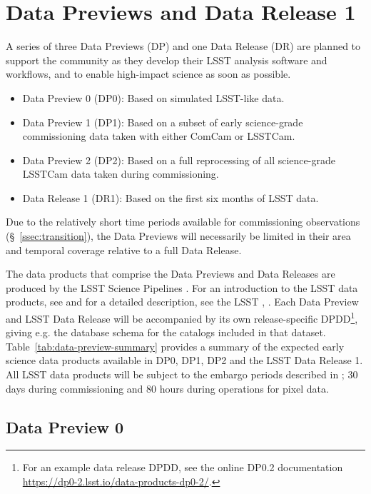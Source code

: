 \section{Data Previews and Data Release 1} 
\label{sec:datapreview}

A series of three Data Previews (DP) and one Data Release (DR) are planned to support the community as they develop their LSST analysis software and workflows, and to enable high-impact science as soon as possible.
\begin{itemize}
\item Data Preview 0 (DP0): Based on simulated LSST-like data.
\item Data Preview 1 (DP1): Based on a subset of early science-grade commissioning data taken with either ComCam or LSSTCam.
\item Data Preview 2 (DP2): Based on a full reprocessing of all science-grade LSSTCam data taken during commissioning.
\item Data Release 1 (DR1): Based on the first six months of LSST data. 
\end{itemize}
Due to the relatively short time periods available for commissioning observations (\S~\ref{ssec:transition}), the Data Previews will necessarily be limited in their area and temporal coverage relative to a full Data Release. 

The data products that comprise the Data Previews and Data Releases are produced by the LSST Science Pipelines \citep{2019ASPC..523..521B,2018PASJ...70S...5B}.
For an introduction to the LSST data products, see \citet{RubinDataProductsAbridged} and for a detailed description, see the LSST \dpdd{},  .
Each Data Preview and LSST Data Release will be accompanied by its own release-specific DPDD\footnote{For an example data release DPDD, see the online DP0.2 documentation {\url{https://dp0-2.lsst.io/data-products-dp0-2/}}.}, giving e.g. the  database schema for the catalogs included in that dataset.
Table~\ref{tab:data-preview-summary} provides a summary of the expected early science data products available in DP0, DP1, DP2 and the LSST Data Release 1.
All LSST data products will be subject to the embargo periods described in  ; 30 days during commissioning and 80 hours during operations for pixel data.



\subsection{Data Preview 0}
\label{sec:dp0}

